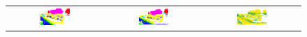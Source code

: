 \begin{figure}[h!]
\begin{tabular}{ccc}
            \includegraphics[width=0.33\textwidth, height=0.18\textheight]{images/seg_output/sem3d_seg_output/2_GT.png} &
            \includegraphics[width=0.33\textwidth, height=0.18\textheight]{images/seg_output/sem3d_seg_output/2_Pred.png}& 
            \includegraphics[width=0.33\textwidth, height=0.18\textheight]{images/seg_output/sem3d_seg_output/2_max_prob.png}\\


\end{tabular}
\end{figure}
